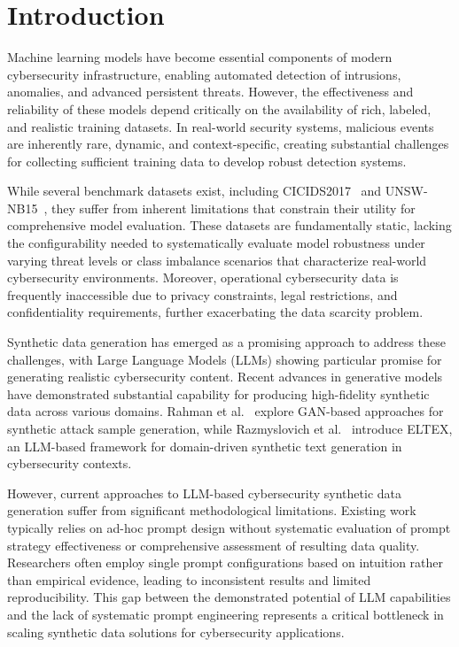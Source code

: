 \section{Introduction}\label{sec:introduction}

Machine learning models have become essential components of modern cybersecurity infrastructure, enabling automated detection of intrusions, anomalies, and advanced persistent threats. However, the effectiveness and reliability of these models depend critically on the availability of rich, labeled, and realistic training datasets. In real-world security systems, malicious events are inherently rare, dynamic, and context-specific, creating substantial challenges for collecting sufficient training data to develop robust detection systems.

While several benchmark datasets exist, including CICIDS2017~\cite{sharafaldin2018toward} and UNSW-NB15~\cite{moustafa2015unsw}, they suffer from inherent limitations that constrain their utility for comprehensive model evaluation. These datasets are fundamentally static, lacking the configurability needed to systematically evaluate model robustness under varying threat levels or class imbalance scenarios that characterize real-world cybersecurity environments. Moreover, operational cybersecurity data is frequently inaccessible due to privacy constraints, legal restrictions, and confidentiality requirements, further exacerbating the data scarcity problem.

Synthetic data generation has emerged as a promising approach to address these challenges, with Large Language Models (LLMs) showing particular promise for generating realistic cybersecurity content. Recent advances in generative models have demonstrated substantial capability for producing high-fidelity synthetic data across various domains. Rahman et al.~\cite{rahman2025leveraging} explore GAN-based approaches for synthetic attack sample generation, while Razmyslovich et al.~\cite{razmyslovich2025eltex} introduce ELTEX, an LLM-based framework for domain-driven synthetic text generation in cybersecurity contexts.

However, current approaches to LLM-based cybersecurity synthetic data generation suffer from significant methodological limitations. Existing work typically relies on ad-hoc prompt design without systematic evaluation of prompt strategy effectiveness or comprehensive assessment of resulting data quality. Researchers often employ single prompt configurations based on intuition rather than empirical evidence, leading to inconsistent results and limited reproducibility. This gap between the demonstrated potential of LLM capabilities and the lack of systematic prompt engineering represents a critical bottleneck in scaling synthetic data solutions for cybersecurity applications.

